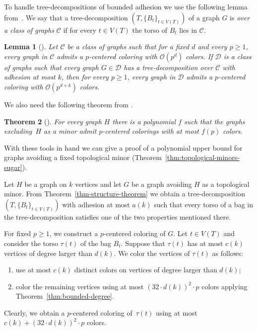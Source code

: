 \documentclass[11pt]{article}
\newtheorem{theorem}{Theorem}
\newtheorem{lemma}[theorem]{Lemma}
\begin{document}
To handle tree-decompositions of bounded adhesion we use 
the following lemma from~\cite{PS19}.
We say that a tree-decomposition $(T,\{B_t\}_{t\in V(T)})$ of a graph $G$ is \emph{over 
a class of graphs} $\mathcal{C}$ if for every $t\in V(T)$ 
the torso of $B_t$ lies in $\mathcal{C}$.

\begin{lemma}[\cite{PS19}]\label{lemma-lifting-through-bounded-adhesion}
  Let $\mathcal{C}$ be a class of graphs such that for a fixed $d$ and every
  $p\geq1$, every graph in $\mathcal{C}$ admits a $p$-centered coloring with
  $\mathcal{O}(p^d)$ colors.  If $\mathcal{D}$ is a class of graphs such that every
  graph $G\in\mathcal{D}$ has a tree-decomposition over $\mathcal{C}$ with
  adhesion at most $k$, then for every $p\geq1$, every graph in
  $\mathcal{D}$ admits a $p$-centered coloring with $\mathcal{O}(p^{d+k})$ colors.
\end{lemma}


We also need the following theorem from \cite{PS19}.

\begin{theorem}[\cite{PS19}]\label{theorem-proper-minor-closed}
For every graph $H$ there is a polynomial $f$ such that 
the graphs excluding~$H$ as a minor admit $p$-centered
colorings with at most $f(p)$ colors.
\end{theorem}

With these tools in hand we can give a proof of a polynomial upper bound 
for graphs avoiding a fixed topological minor (Theorem~\ref{thm:topological-minors-sugar}).

Let $H$ be a graph on $k$ vertices and 
let $G$ be a graph avoiding $H$ as a topological minor. From
Theorem~\ref{thm-structure-theorem} we obtain a tree-decomposition 
$(T,\{B_t\}_{t\in V(T)})$ with adhesion at most $a(k)$ such that
every torso of a bag in the tree-decomposition satisfies one of the two 
properties mentioned there.

For fixed $p\geq1$, we construct a $p$-centered coloring of $G$. 
Let $t\in V(T)$ and consider the torso $\tau(t)$ of the bag $B_t$.
Suppose that $\tau(t)$ has at most $c(k)$ vertices of degree larger than $d(k)$.
We color the vertices of $\tau(t)$ as follows:
\begin{enumerate}
\item use at most $c(k)$ distinct colors on vertices of degree larger than $d(k)$;
\item color the remaining vertices using at most $(32\cdot d(k))^2\cdot p$ colors 
applying Theorem~\ref{thm:bounded-degree}.
\end{enumerate}
Clearly, we obtain a $p$-centered coloring of~$\tau(t)$ using at most
$c(k)+(32\cdot d(k))^2\cdot p$ colors.
\end{document}
